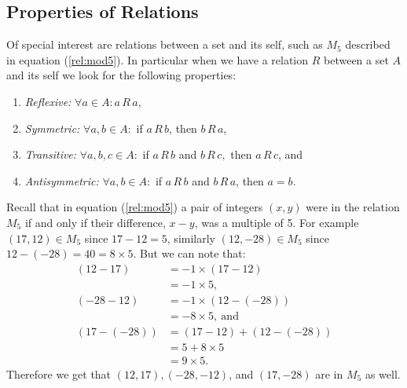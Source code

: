 \subsection*{Properties of Relations}
\begin{defn}
    Of special interest are relations between a set and its self, such as \(M_5\) described in equation (\ref{rel:mod5}).  In particular when we have a relation \(R\) between a set \(A\) and its self we look for the following properties:
    \begin{enumerate}
        \item \emph{Reflexive:} \(\forall a\in A: a\,R\, a\),
        \item \emph{Symmetric:} \(\forall a,b\in A:\) if \(a\,R\, b\), then \(b\, R\, a\),
        \item \emph{Transitive:} \(\forall a,b,c\in A:\) if \(a\,R\, b\) and \(b\,R\, c,\)  then \(a\, R\, c\), and
        \item \emph{Antisymmetric:} \(\forall a,b\in A:\) if \(a\,R\, b\) and \(b\,R\,a\), then \(a=b\).
    \end{enumerate}

    Recall that in equation (\ref{rel:mod5}) a pair of integers \((x,y)\) were in the relation \(M_5\) if and only if their difference, \(x-y\), was a multiple of 5.  For example \((17,12)\in M_5\) since \(17-12=5\), similarly \((12,-28)\in M_5\) since \(12-(-28)=40=8\times 5\).  But we can note that:
    \begin{align}
        (12-17)&=-1\times(17-12)\nonumber\\
            &= -1\times 5 \label{eq:symmetry_M5_1},\\
        (-28-12)&=-1\times(12-(-28))\nonumber\\
            &=-8\times 5\label{eq:symmetry_M5_2},\ \text{and}\\
        (17-(-28))&=(17-12)+(12-(-28))\nonumber\\
            &=5+8\times 5\nonumber\\
            &=9\times5\label{eq:transitive_M5}.
    \end{align}
    Therefore we get that \((12,17), (-28,-12)\), and \((17,-28)\) are in \(M_5\) as well.  
    

\end{defn}
